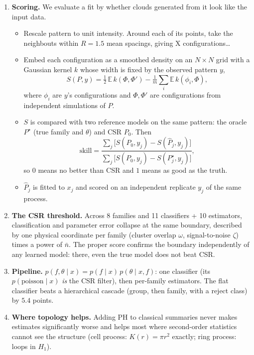 \documentclass[11pt]{article}
\newcommand{\nb}{\bar n}
\begin{document}
\begin{enumerate}
  \item \textbf{Scoring.} We evaluate a fit by whether clouds generated from it look like the
  input data. 
    \begin{itemize}
      \item Rescale pattern to unit intensity. Around each of its points, take the neighbouts within 
      $R=1.5$ mean spacings, giving X configurations\dots
      \item Embed each configuration as a smoothed density on an $N \times N$ grid with a Gaussian kernel $k$
        whose width is fixed by the observed pattern $y$,
        \[
          S(P,y)=\tfrac12\,\mathbb{E}\,k(\Phi,\Phi')-\tfrac1m\textstyle\sum_i\mathbb{E}\,k(\phi_i,\Phi),
        \]
      where $\phi_i$ are $y$'s configurations and $\Phi,\Phi'$ are configurations from independent
      simulations of $P$.
      \item $S$ is compared with two reference models on the same pattern: the oracle $P^\star$
        (true family and $\theta$) and CSR $P_0$. Then
        \[
          \text{skill}=\frac{\sum_j\big[S(P_0,y_j)-S(\hat P_j,y_j)\big]}{\sum_j\big[S(P_0,y_j)-S(P^\star_j,y_j)\big]},
        \]
      so $0$ means no better than CSR and $1$ means as good as the truth.
      \item $\hat P_j$ is fitted to $x_j$ and scored on an independent
      replicate $y_j$ of the same process.
    \end{itemize} 
  \item \textbf{The CSR threshold.} Across 8 families and 11 classifiers + 10 estimators, classification
    and parameter error collapse at the same boundary, described by one physical coordinate per family (cluster
    overlap $\omega$, signal-to-noise $\zeta$) times a power of $\nb$. The proper score confirms the boundary
    independently of any learned model: there, even the true model does not beat CSR.
  \item \textbf{Pipeline.} $p(f,\theta\mid x)=p(f\mid x)\,p(\theta\mid x,f)$:
    one classifier (its $p(\text{poisson}\mid x)$ \emph{is} the CSR filter), then per-family estimators. The flat
    classifier beats a hierarchical cascade (group, then family, with a reject class) by $5.4$ points.
  \item \textbf{Where topology helps.} Adding PH to classical summaries never makes estimates significantly
    worse and helps most where second-order statistics cannot see the structure (cell process: $K(r)=\pi r^2$
    exactly; ring process: loops in $H_1$).
\end{enumerate}
\end{document}
